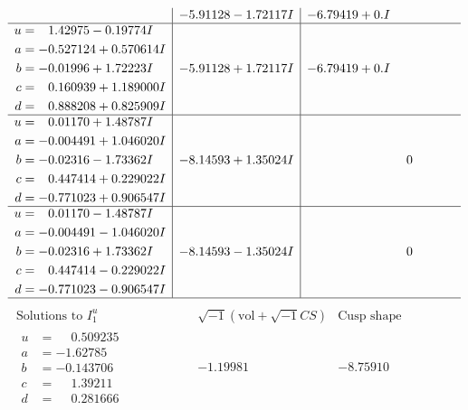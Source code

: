 \documentclass[1p]{elsarticle_modified}
\theoremstyle{definition}
\newcommand{\I}{\sqrt{-1}}
\begin{document}
$$\begin{array}{c|c|c}
 & -5.91128 - 1.72117 I & -6.79419 + 0. I\phantom{ +0.000000I} \\ \hline\begin{aligned}
u &= \phantom{-}1.42975 - 0.19774 I \\
a &= -0.527124 + 0.570614 I \\
b &= -0.01996 + 1.72223 I \\
c &= \phantom{-}0.160939 + 1.189000 I \\
d &= \phantom{-}0.888208 + 0.825909 I\end{aligned}
 & -5.91128 + 1.72117 I & -6.79419 + 0. I\phantom{ +0.000000I} \\ \hline\begin{aligned}
u &= \phantom{-}0.01170 + 1.48787 I \\
a &= -0.004491 + 1.046020 I \\
b &= -0.02316 - 1.73362 I \\
c &= \phantom{-}0.447414 + 0.229022 I \\
d &= -0.771023 + 0.906547 I\end{aligned}
 & -8.14593 + 1.35024 I & \phantom{-0.000000 } 0 \\ \hline\begin{aligned}
u &= \phantom{-}0.01170 - 1.48787 I \\
a &= -0.004491 - 1.046020 I \\
b &= -0.02316 + 1.73362 I \\
c &= \phantom{-}0.447414 - 0.229022 I \\
d &= -0.771023 - 0.906547 I\end{aligned}
 & -8.14593 - 1.35024 I & \phantom{-0.000000 } 0\\
 \hline 
 \end{array}$$\newpage$$\begin{array}{c|c|c}  
\text{Solutions to }I^u_{1}& \I (\text{vol} + \sqrt{-1}CS) & \text{Cusp shape}\\
 \hline 
\begin{aligned}
u &= \phantom{-}0.509235\phantom{ +0.000000I} \\
a &= -1.62785\phantom{ +0.000000I} \\
b &= -0.143706\phantom{ +0.000000I} \\
c &= \phantom{-}1.39211\phantom{ +0.000000I} \\
d &= \phantom{-}0.281666\phantom{ +0.000000I}\end{aligned}
 & -1.19981\phantom{ +0.000000I} & -8.75910\phantom{ +0.000000I} \\ \hline\begin{aligned}

\end{aligned}
\end{array}$$
\end{document}
